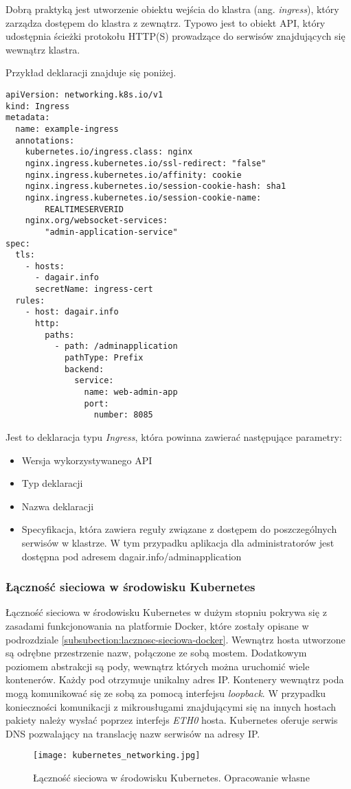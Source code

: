 Dobrą praktyką jest utworzenie obiektu wejścia do klastra (ang. \textit{ingress}), który 
zarządza dostępem do klastra z zewnątrz. Typowo jest to obiekt API, który udostępnia 
ścieżki protokołu HTTP(S) prowadzące do serwisów znajdujących się wewnątrz klastra.

Przykład deklaracji znajduje się poniżej.

\begin{lstlisting}
apiVersion: networking.k8s.io/v1
kind: Ingress
metadata:
  name: example-ingress
  annotations:
    kubernetes.io/ingress.class: nginx
    nginx.ingress.kubernetes.io/ssl-redirect: "false"
    nginx.ingress.kubernetes.io/affinity: cookie
    nginx.ingress.kubernetes.io/session-cookie-hash: sha1
    nginx.ingress.kubernetes.io/session-cookie-name: 
        REALTIMESERVERID
    nginx.org/websocket-services: 
        "admin-application-service"
spec:
  tls:
    - hosts:
      - dagair.info
      secretName: ingress-cert
  rules:
    - host: dagair.info
      http:
        paths:
          - path: /adminapplication
            pathType: Prefix
            backend:
              service:
                name: web-admin-app
                port:
                  number: 8085
\end{lstlisting}

Jest to deklaracja typu \textit{Ingress}, która powinna zawierać następujące parametry:

\begin{itemize} %
    \item Wersja wykorzystywanego API
    \item Typ deklaracji
    \item Nazwa deklaracji
    \item Specyfikacja, która zawiera reguły związane z dostępem do poszczególnych 
    serwisów w klastrze. W tym przypadku aplikacja dla administratorów jest dostępna 
    pod adresem dagair.info/adminapplication
\end{itemize}

\subsubsection{Łączność sieciowa w środowisku Kubernetes}

Łączność sieciowa w środowisku Kubernetes w dużym stopniu pokrywa się z zasadami funkcjonowania
na platformie Docker, które zostały opisane w podrozdziale \ref{subsubection:lacznosc-sieciowa-docker}.
Wewnątrz hosta utworzone są odrębne przestrzenie nazw, połączone ze sobą mostem. Dodatkowym poziomem
abstrakcji są pody, wewnątrz których można uruchomić wiele kontenerów. Każdy pod otrzymuje unikalny adres
IP. Kontenery wewnątrz poda mogą komunikować się ze sobą za pomocą interfejsu \textit{loopback}.
W przypadku konieczności komunikacji z mikrousługami znajdującymi się na innych hostach pakiety
należy wysłać poprzez interfejs \textit{ETH0} hosta. 
Kubernetes oferuje serwis DNS pozwalający na translację nazw serwisów na adresy IP.

\begin{figure}[h]
  \centering
  \texttt{[image: kubernetes\_networking.jpg]}
  \caption{Łączność sieciowa w środowisku Kubernetes. Opracowanie własne}
  \label{fig:kubernetes-networking}
\end{figure}